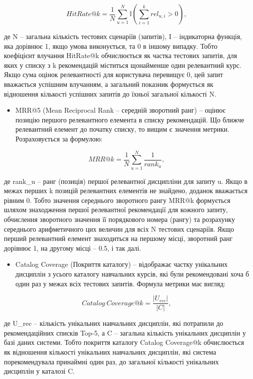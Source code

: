 \documentclass[
]{article}
\begin{document}
\[HitRate@k = \frac{1}{N}\sum_{u = 1}^{N}\mathbb{I}\left( \sum_{i = 1}^{k}rel_{u,i} > 0 \right),\]

де N -- загальна кількість тестових сценаріїв (запитів), I --
індикаторна функція, яка дорівнює 1, якщо умова виконується, та 0 в
іншому випадку. Тобто коефіцієнт влучання HitRate@k обчислюється як
частка тестових запитів, для яких у списку з k рекомендацій міститься
щонайменше один релевантний курс. Якщо сума оцінок релевантності для
користувача перевищує 0, цей запит вважається успішним влучанням, а
загальний показник формується як відношення кількості успішних запитів
до їхньої загальної кількості N.

\begin{itemize}
\item
  MRR@5 (Mean Reciprocal Rank -- середній зворотний ранг) -- оцінює
  позицію першого релевантного елемента в списку рекомендацій. Що ближче
  релевантний елемент до початку списку, то вищим є значення метрики.
  Розраховується за формулою:
\end{itemize}

\[MRR@k = \frac{1}{N}\sum_{u = 1}^{N}\frac{1}{rank_{u}},\]

де rank\_u -- ранг (позиція) першої релевантної дисципліни для запиту u.
Якщо в межах перших k позицій релевантних елементів не знайдено, доданок
вважається рівним 0. Тобто значення середнього зворотного рангу MRR@k
формується шляхом знаходження першої релевантної рекомендації для
кожного запиту, обчислення зворотного значення її порядкового номера
(рангу) та розрахунку середнього арифметичного цих величин для всіх N
тестових сценаріїв. Якщо перший релевантний елемент знаходиться на
першому місці, зворотний ранг дорівнює 1, на другому місці -- 0.5, і так
далі.

\begin{itemize}
\item
  Catalog Coverage (Покриття каталогу) -- відображає частку унікальних
  дисциплін з усього каталогу навчальних курсів, які були рекомендовані
  хоча б один раз у межах всіх тестових запитів. Формула метрики має
  вигляд:
\end{itemize}

\[Catalog\ Coverage@k = \frac{|U_{rec}|}{|C|},\]

де \textbar U\_rec\textbar{} -- кількість унікальних навчальних
дисциплін, які потрапили до рекомендаційних списків Top-5, а
\textbar C\textbar{} -- загальна кількість унікальних дисциплін у базі
даних системи. Тобто покриття каталогу Catalog Coverage@k обчислюється
як відношення кількості унікальних навчальних дисциплін, які система
порекомендувала принаймні один раз, до загальної кількості унікальних
дисциплін у каталозі C.
\end{document}
